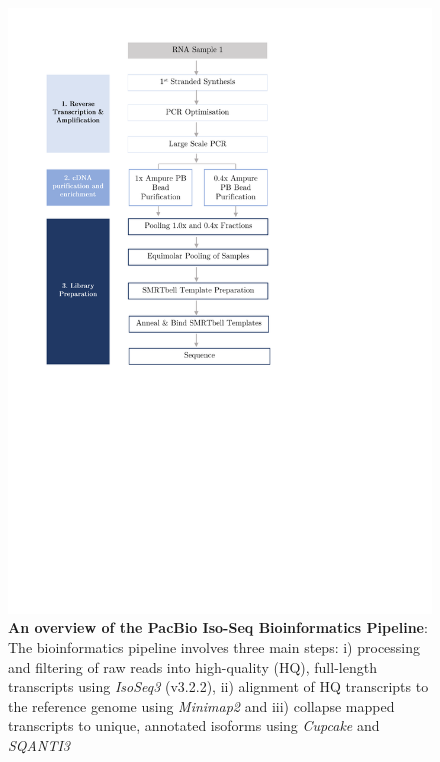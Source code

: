 \begin{figure}[]
	\centering
	\vspace{20pt}
	\includegraphics[page=17,trim={0 4.5cm 0 0},clip,scale = 0.8]{Figures/ProjectDevelopment_Figures.pdf}
	\captionsetup{width=0.95\textwidth}
	\caption[PacBio Iso-Seq Bioinformatics Pipeline]%
	{\textbf{An overview of the PacBio Iso-Seq Bioinformatics Pipeline}: The bioinformatics pipeline involves three main steps: i) processing and filtering of raw reads into high-quality (HQ), full-length transcripts using \textit{IsoSeq3} (v3.2.2), ii) alignment of HQ transcripts to the reference genome using \textit{Minimap2} and iii) collapse mapped transcripts to unique, annotated isoforms using \textit{Cupcake} and \textit{SQANTI3}}
	\label{fig:isoseq_bioinformatics_Pipeline}
\end{figure}

\clearpage
